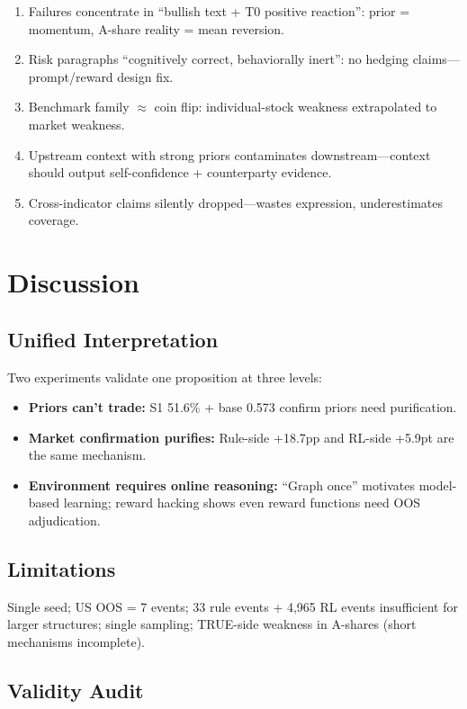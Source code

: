 \documentclass[sigconf, anonymous, review]{acmart}
\begin{document}
\begin{enumerate}
    \item Failures concentrate in ``bullish text + T0 positive reaction'': prior = momentum, A-share reality = mean reversion.
    \item Risk paragraphs ``cognitively correct, behaviorally inert'': no hedging claims---prompt/reward design fix.
    \item Benchmark family $\approx$ coin flip: individual-stock weakness extrapolated to market weakness.
    \item Upstream context with strong priors contaminates downstream---context should output self-confidence + counterparty evidence.
    \item Cross-indicator claims silently dropped---wastes expression, underestimates coverage.
\end{enumerate}

\section{Discussion}

\subsection{Unified Interpretation}

Two experiments validate one proposition at three levels:
\begin{itemize}
    \item \textbf{Priors can't trade:} S1 51.6\% + base 0.573 confirm priors need purification.
    \item \textbf{Market confirmation purifies:} Rule-side +18.7pp and RL-side +5.9pt are the same mechanism.
    \item \textbf{Environment requires online reasoning:} ``Graph once'' motivates model-based learning; reward hacking shows even reward functions need OOS adjudication.
\end{itemize}

\subsection{Limitations}

Single seed; US OOS = 7 events; 33 rule events + 4,965 RL events insufficient for larger structures; single sampling; TRUE-side weakness in A-shares (short mechanisms incomplete).

\subsection{Validity Audit}
\end{document}
